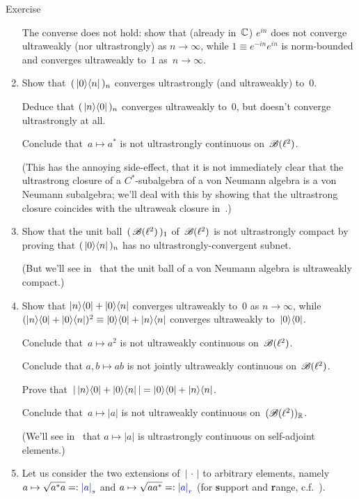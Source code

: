 \documentclass[a]{subfiles}
\begin{document}
\begin{parsec}
\begin{point}[vn-counterexamples]{Exercise}
\begin{enumerate}
The converse does not hold:
show that (already in~$\mathbb{C}$)
$e^{in}$
does not converge ultraweakly 
(nor ultrastrongly) as $n\to \infty$,
while $1\equiv e^{-in} e^{in}$
is norm-bounded and
converges ultraweakly to~$1$ as~$n\to\infty$.
\item
\label{vn-counterexamples-4}
Show that~$(\,\left|0\right>\!\left<n\right|\,)_n$ converges ultrastrongly 
(and ultraweakly) to~$0$.

Deduce that $(\,\left|n\right>\!\left<0\right|\,)_n$ converges ultraweakly to~$0$,
but doesn't converge ultrastrongly at all.

Conclude that~$a\mapsto a^*$ is not ultrastrongly continuous 
on~$\mathscr{B}(\ell^2)$.

(This has the annoying side-effect,
that it is not immediately clear that the ultrastrong
closure of a $C^*$-subalgebra of a von Neumann algebra 
is a von Neumann subalgebra; we'll deal with this
by showing that the ultrastrong closure coincides
with the ultraweak closure in~.)
\item
Show that the unit ball~$(\,\mathscr{B}(\ell^2)\,)_1$
of~$\mathscr{B}(\ell^2)$ is not ultrastrongly compact
by proving that $(\,\left|0\right>\!\left<n\right|\,)_n$
has no ultrastrongly-convergent subnet.

(But we'll see in~ that
the unit ball of a von Neumann algebra
is ultraweakly compact.)

\item
\label{vn-counterexamples-6}
Show that $\left|n\right>\!\left<0\right|+\left|0\right>\!\left<n\right|$
converges ultraweakly to~$0$ as $n\to \infty$,
while $(\left|n\right>\!\left<0\right|+\left|0\right>\!\left<n\right|)^2\equiv \left|0\right>\!\left<0\right|+\left|n\right>\!\left<n\right|$
converges ultraweakly to~$\left|0\right>\!\left<0\right|$.

Conclude that~$a\mapsto a^2$ is not ultraweakly continuous on~$\mathscr{B}(\ell^2)$.

Conclude that $a,b\mapsto ab$ is not jointly ultraweakly continuous
on~$\mathscr{B}(\ell^2)$.

Prove that~$\left|\, \left|n\right>\!\left<0\right|+\left|0\right>\!\left<n\right|\,\right|
= \left|0\right>\!\left<0\right|+\left|n\right>\!\left<n\right|$.

Conclude that~$a\mapsto \left|a\right|$
is not ultraweakly continuous on~$(\mathscr{B}(\ell^2))_{\mathbb{R}}$.

(We'll see in~ that $a\mapsto \left|a\right|$
is ultrastrongly continuous on self-adjoint elements.)

\item
Let us consider the two extensions of~$\left|\,\cdot\,\right|$
to arbitrary elements, namely
$a\mapsto \sqrt{a^*a}=:\Define{\left|a\right|_s}$ and 
$a\mapsto \sqrt{aa^*}=:\Define{\left|a\right|_r}$
(for \textbf{s}upport and \textbf{r}ange,
c.f.~).


\end{enumerate}
\end{point}
\end{parsec}
\end{document}
